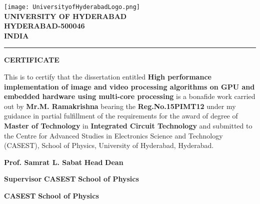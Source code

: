 \newpage
\vspace{-5cm}
{\centering
	\texttt{[image: UniversityofHyderabadLogo.png]}\\
	\textbf{UNIVERSITY OF HYDERABAD}\\
	\textbf{HYDERABAD-500046}\\
	\textbf{INDIA}\\
	\rule{\textwidth}{2pt}
	\begin{center}
		\textbf{CERTIFICATE}
	\end{center}}

This is to certify that the dissertation entitled \textbf{High performance implementation of image and video processing algorithms on GPU and embedded hardware using multi-core processing} is a bonafide work carried out by \textbf{Mr.M. Ramakrishna} bearing the \textbf{Reg.No.15PIMT12} under my guidance in partial fulfillment of the requirements for the award of degree of \textbf{Master of Technology} in \textbf{Integrated Circuit Technology} and submitted to the Centre for Advanced Studies in Electronics Science and Technology (CASEST), School of Physics, University of Hyderabad, Hyderabad.\par
\vspace{5cm}
\textbf{Prof. Samrat L. Sabat} \hspace{0.6cm} \textbf{Head} \hspace{3cm} \textbf{Dean}\par
\textbf{Supervisor} \hspace{3.1cm} \textbf{CASEST} \hspace{2.5cm} \textbf{School of Physics}\par
\textbf{CASEST}\hspace{3.5cm} \textbf{School of Physics}\par

